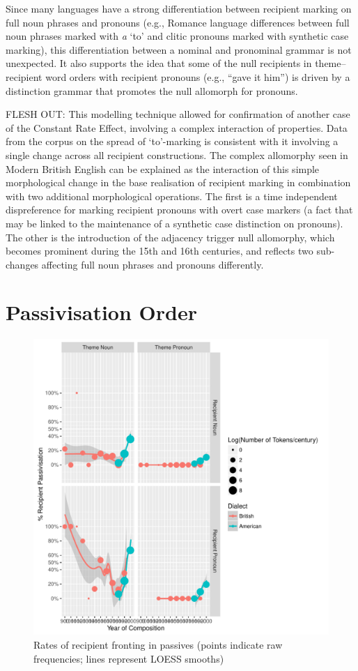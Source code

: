 	Since many languages have a strong differentiation between recipient marking on full noun phrases and pronouns (e.g., Romance language differences between full noun phrases marked with \textit{a} `to' and clitic pronouns marked with synthetic case marking), this differentiation between a nominal and pronominal grammar is not unexpected. It also supports the idea that some of the null recipients in theme--recipient word orders with recipient pronouns (e.g., ``gave it him'') is driven by a distinction grammar that promotes the null allomorph for pronouns.

FLESH OUT:	This modelling technique allowed for confirmation of another case of the Constant Rate Effect, involving a complex interaction of properties. Data from the corpus on the spread of `to'-marking is consistent with it involving a single change across all recipient constructions. The complex allomorphy seen in Modern British English can be explained as the interaction of this simple morphological change in the base realisation of recipient marking in combination with two additional morphological operations. The first is a time independent dispreference for marking recipient pronouns with overt case markers (a fact that may be linked to the maintenance of a synthetic case distinction on pronouns). The other is the introduction of the adjacency trigger null allomorphy, which becomes prominent during the 15th and 16th centuries, and reflects two sub-changes affecting full noun phrases and pronouns differently.

\section{Passivisation Order}
	\begin{figure}[p!]
		\includegraphics[width=.9\linewidth]{../images/rec-pas-graph}
		\caption{Rates of recipient fronting in passives (points indicate raw frequencies; lines represent LOESS smooths)}
		\label{fig:rec-pas}
	\end{figure}


